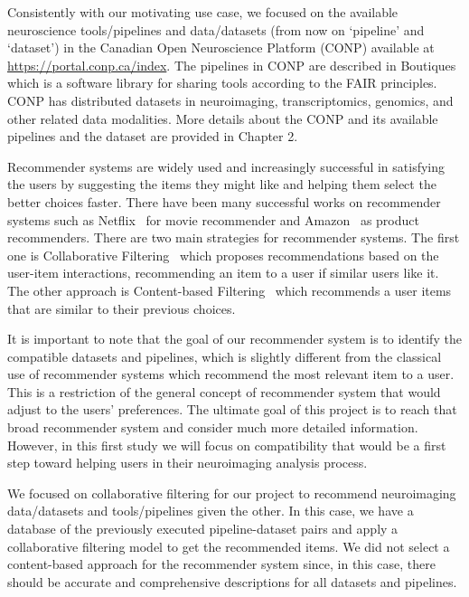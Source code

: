 Consistently with our motivating use case, we focused on the available neuroscience tools/pipelines and data/datasets (from now on `pipeline' and `dataset') in the Canadian Open Neuroscience Platform (CONP) available at \url{https://portal.conp.ca/index}. The pipelines in CONP are described in Boutiques~\cite{glatard2018boutiques} which is a software library for sharing tools according to the FAIR principles. CONP has distributed datasets in neuroimaging, transcriptomics, genomics, and other related data modalities. More details about the CONP and its available pipelines and the dataset are provided in Chapter 2.



Recommender systems are widely used and increasingly successful in satisfying the users by suggesting the items they might like and helping them select the better choices faster. There have been many successful works on recommender systems such as Netflix~\cite{bennett2007netflix} for movie recommender and Amazon~\cite{7927889} as product recommenders. There are two main strategies for recommender systems. The first one is Collaborative Filtering~\cite{rajaraman2011mining} which proposes recommendations based on the user-item interactions, recommending an item to a user if similar users like it. The other approach is Content-based Filtering~\cite{pazzani2007content} which recommends a user items that are similar to their previous choices.  

It is important to note that the goal of our recommender system is to identify the compatible datasets and pipelines, which is slightly different from the classical use of recommender systems which recommend the most relevant item to a user. This is a restriction of the general concept of recommender system that would adjust to the users' preferences. The ultimate goal of this project is to reach that broad recommender system and consider much more detailed information. However, in this first study we will focus on compatibility that would be a first step toward helping users in their neuroimaging analysis process.


We focused on collaborative filtering for our project to recommend neuroimaging data/datasets and tools/pipelines given the other. In this case, we have a database of the previously executed pipeline-dataset pairs and apply a collaborative filtering model to get the recommended items. We did not select a content-based approach for the recommender system since, in this case, there should be accurate and comprehensive descriptions for all datasets and pipelines. 
 

